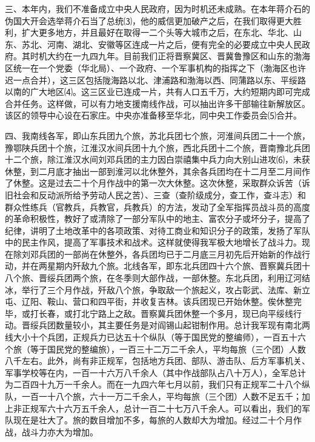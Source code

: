 \documentclass[UTF-8, a5paper, 12pt]{ctexart}
\begin{document}
三、本年内，我们不准备成立中央人民政府，因为时机还未成熟。在本年蒋介石的伪国大开会选举蒋介石当了总统⑶，他的威信更加破产之后，在我们取得更大胜利，扩大更多地方，并且最好在取得一二个头等大城市之后，在东北、华北、山东、苏北、河南、湖北、安徽等区连成一片之后，便有完全的必要成立中央人民政府。其时机大约在一九四九年。目前我们正将晋察冀区、晋冀鲁豫区和山东的渤海区统一在一个党委（华北局）、一个政府、一个军事机构的指挥之下（渤海区也许迟一点合并），这三区包括陇海路以北、津浦路和渤海以西、同蒲路以东、平绥路以南的广大地区⑷。这三区业已连成一片，共有人口五千万，大约短期内即可完成合并任务。这样做，可以有力地支援南线作战，可以抽出许多干部输往新解放区。该区的领导中心设在石家庄。中央亦准备移至华北，同中央工作委员会⑸合并。

四、我南线各军，即山东兵团九个旅，苏北兵团七个旅，河淮间兵团二十一个旅，豫鄂陕兵团十个旅，江淮汉水间兵团十九个旅，西北兵团十二个旅，晋南豫北兵团十二个旅，除江淮汉水间刘邓兵团的主力因白崇禧集中兵力向大别山进攻⑹，未获休整，到二月底才抽出一部到淮河以北休整外，其余各兵团均在十二月至二月间作了休整。这是过去二十个月作战中的第一次大休整。这次休整，采取群众诉苦（诉旧社会和反动派所给予劳动人民之苦）、三查（查阶级成分，查工作，查斗志）和群众性练兵（官教兵，兵教官，兵教兵）的方法，发动了全军指挥员战斗员的高度的革命积极性，教好了或清除了一部分军队中的地主、富农分子或坏分子，提高了纪律，讲明了土地改革中的各项政策、对待工商业和知识分子的政策，发扬了军队中的民主作风，提高了军事技术和战术。这样就使得我军极大地增长了战斗力。现在除刘邓兵团的一部尚在休整外，各兵团均已于二月底三月初先后开始新的作战行动，并在两星期内歼敌九个旅。北线各军，即东北兵团四十六个旅、晋察冀兵团十八个旅、晋绥兵团两个旅，在冬季则大部作战，一部休整。东北兵团，利用辽河结冰，举行了三个月作战，歼敌八个旅，争取敌一个旅起义，攻占彰武、法库、新立屯、辽阳、鞍山、营口和四平街，并收复吉林。该兵团现已开始休整。俟休整完毕，或打长春，或打北宁路上之敌。晋察冀兵团休整一个多月，现已向平绥线行动。晋绥兵团数量较小，其主要任务是对阎锡山起钳制作用。总计我军现有南北两线大小十个兵团，正规兵力已达五十个纵队（等于国民党的整编师），一百五十六个旅（等于国民党的整编旅），一百三十二万二千余人，平均每旅（三个团）人数八千左右。此外，尚有非正规军，包括地方兵团、部队、游击队、后方军事机关、军事学校等在内，一百一十六万八千余人（其中作战部队占八十万人），全军总计为二百四十九万一千余人。而在一九四六年七月以前，我们只有正规军二十八个纵队，一百一十八个旅，六十一万二千余人，平均每旅（三个团）人数不足五千；加上非正规军六十六万五千余人，总计一百二十七万八千余人。可以看出，我们的军队现在是壮大了。旅的数目增加不多，每旅的人数却大为增加。经过二十个月作战，战斗力亦大为增加。
\end{document}
